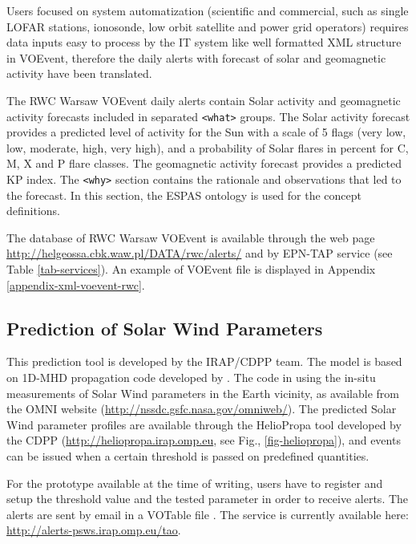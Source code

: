 \documentclass[referee,a4paper,12pt,traditabstract]{swsc}
\begin{document}
\begin{linenumbers}
Users focused on system automatization (scientific and commercial, such as single LOFAR stations, ionosonde, low orbit satellite and power grid operators) requires data inputs easy to process by the IT system like well formatted XML structure in VOEvent, therefore the daily alerts with forecast of solar and geomagnetic activity have been translated. 

The RWC Warsaw VOEvent daily alerts contain Solar activity and geomagnetic activity forecasts included in separated  {\tt <what>} groups. The Solar activity forecast provides a predicted level of activity for the Sun with a scale of 5 flags (very low, low, moderate, high, very high), and a probability of Solar flares in percent for C, M, X and P flare classes. The geomagnetic activity forecast provides a predicted KP index. The {\tt <why>} section contains the rationale and observations that led to the forecast. In this section, the ESPAS \cite{Belehaki:2016bq} ontology is used for the concept definitions.

The database of RWC Warsaw VOEvent is available through the web page \url{http://helgeossa.cbk.waw.pl/DATA/rwc/alerts/} and by EPN-TAP service (see Table \ref{tab-services}). An example of VOEvent file is displayed in Appendix \ref{appendix-xml-voevent-rwc}.


 
\subsection{Prediction of Solar Wind Parameters}
This prediction tool is developed by the IRAP/CDPP team. The model is based on 1D-MHD propagation code developed by \cite{doi:10.1029/2004JA010959}. The code in using the in-situ measurements of Solar Wind parameters in the Earth vicinity, as available from the OMNI website (\url{http://nssdc.gsfc.nasa.gov/omniweb/}). The predicted Solar Wind parameter profiles are available through the HelioPropa tool developed by the CDPP (\url{http://heliopropa.irap.omp.eu}, see Fig., \ref{fig-heliopropa}), and events can be issued when a certain threshold is passed on predefined quantities. 

For the prototype available at the time of writing, users have to register and setup the threshold value and the tested parameter in order to receive alerts. The alerts are sent by email in a VOTable file \cite{2013ivoa.spec.0920O}. The service is currently available here: \url{http://alerts-psws.irap.omp.eu/tao}.


\end{linenumbers}
\end{document}
